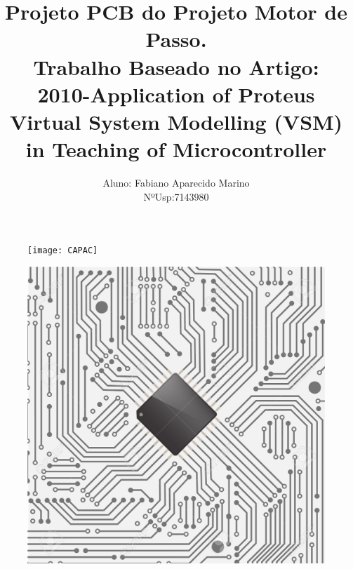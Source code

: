 \documentclass{Fabiano_file}
\title{Projeto PCB do Projeto Motor de Passo.\\Trabalho Baseado no Artigo:\\2010-Application of Proteus Virtual System Modelling (VSM) in Teaching of Microcontroller }
\author{Aluno: Fabiano Aparecido Marino \\NºUsp:7143980}
\begin{document}
{

	\newpage
	\thispagestyle{empty}
	\clearpage
	\begin{figure}
		\centering
		\texttt{[image: CAPAC]}
	\end{figure}
	\clearpage
	\newpage

\maketitle

\begin{figure}[h!]
\centering
\includegraphics[width=.9\textwidth]{capa.jpg}
\end{figure}

\newpage

\tableofcontents
\listoffigures
\newpage

}
\end{document}
